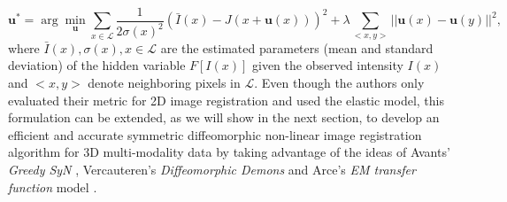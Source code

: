 \begin{equation}\label{eq:arce_elastic}
    \mathbf{u}^{*} = \arg \min_{\mathbf{u}} \sum_{x \in \mathcal{L}} \frac{1}{2 \sigma(x)^{2}} ( \bar{I}(x) - J(x + \mathbf{u}(x)))^{2} + \lambda \sum_{<x, y>} ||\mathbf{u}(x) - \mathbf{u}(y)||^{2},
\end{equation}
where $\bar{I}(x), \sigma(x), x\in \mathcal{L}$ are the estimated parameters (mean and standard deviation) of the hidden variable $F[I(x)]$ given the
observed intensity $I(x)$ and $<x, y>$ denote neighboring pixels in $\mathcal{L}$. Even though the authors only evaluated their metric for 2D image registration and used
the elastic model, this formulation can be extended, as we will show in the next section, to develop an efficient and accurate symmetric diffeomorphic non-linear image registration algorithm for 3D multi-modality data by taking advantage of the ideas of Avants' \textit{Greedy SyN} \citep{Avants2008}, Vercauteren's \textit{Diffeomorphic Demons} \citep{Vercauteren2009}and Arce's \textit{EM transfer function} model \citep{Arce-santana2014}.\\
